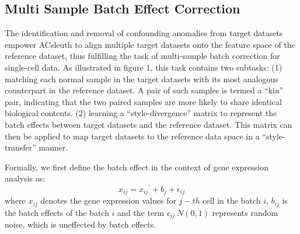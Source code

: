 \documentclass{article}
\begin{document}
\subsection{Multi Sample Batch Effect Correction}
The identification and removal of confounding anomalies from target datasets empower 
ACsleuth to align multiple target datasets onto the feature space of the reference dataset, 
thus fulfilling the task of multi-sample batch correction for single-cell data. As 
illustrated in figure 1, this task contains two subtasks: (1) matching each normal sample 
in the target datasets with its most analogous counterpart in the reference dataset. A 
pair of such samples is termed a “kin” pair, indicating that the two paired samples are 
more likely to share identical biological contents. (2) learning a “style-divergence” 
matrix to represent the batch effects between target datasets and the reference dataset. 
This matrix can then be applied to map target datasets to the reference data space in a 
“style-transfer” manner.

Formally, we first define the batch effect in the context of gene expression analysis as: 
\begin{equation}
    x_{ij}={x_{ij}}^{'}+b_j+\epsilon_{ij}
\end{equation}
where $x_{ij}$ denotes the gene expression values for $j-th$ cell in the batch $i$, $b_{ij}$ 
is the batch effects of the batch $i$ and the term $\epsilon_{ij}~N(0,1)$ represents random noise, 
which is uneffected by batch effects.
\end{document}
